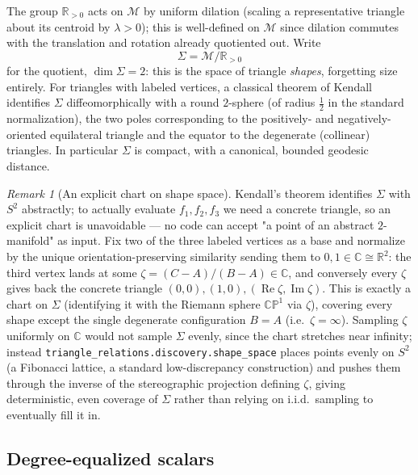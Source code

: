 \documentclass[11pt,reqno]{amsart}
\numberwithin{equation}{section}
\theoremstyle{definition}
\theoremstyle{remark}
\newtheorem{remark}[theorem]{Remark}
\newcommand{\M}{\mathcal{M}}
\begin{document}
The group $\mathbb R_{>0}$ acts on $\M$ by uniform dilation (scaling a
representative triangle about its centroid by $\lambda>0$); this is
well-defined on $\M$ since dilation commutes with the translation and
rotation already quotiented out. Write
\begin{equation}
  \Sigma=\M/\mathbb R_{>0}
\end{equation}
for the quotient, $\dim\Sigma=2$: this is the space of triangle
\emph{shapes}, forgetting size entirely. For triangles with labeled
vertices, a classical theorem of Kendall~\cite{kendall1984} identifies
$\Sigma$ diffeomorphically with a round $2$-sphere (of radius $\tfrac12$ in
the standard normalization), the two poles corresponding to the
positively- and negatively-oriented equilateral triangle and the equator to
the degenerate (collinear) triangles. In particular $\Sigma$ is compact,
with a canonical, bounded geodesic distance.

\begin{remark}[An explicit chart on shape space]\label{rem:chart}
Kendall's theorem identifies $\Sigma$ with $S^2$ abstractly; to actually
evaluate $f_1,f_2,f_3$ we need a concrete triangle, so an explicit chart is
unavoidable --- no code can accept "a point of an abstract $2$-manifold" as
input. Fix two of the three labeled vertices as a base and normalize by the
unique orientation-preserving similarity sending them to $0,1\in\mathbb
C\cong\mathbb R^2$: the third vertex lands at some
$\zeta=(C-A)/(B-A)\in\mathbb C$, and conversely every $\zeta$ gives back the
concrete triangle $(0,0),(1,0),(\operatorname{Re}\zeta,\operatorname{Im}\zeta)$.
This is exactly a chart on $\Sigma$ (identifying it with the Riemann sphere
$\mathbb{CP}^1$ via $\zeta$), covering every shape except the single
degenerate configuration $B=A$ (i.e.\ $\zeta=\infty$). Sampling $\zeta$
uniformly on $\mathbb C$ would not sample $\Sigma$ evenly, since the chart
stretches near infinity; instead
\texttt{triangle\_relations.discovery.shape\_space} places points evenly on
$S^2$ (a Fibonacci lattice, a standard low-discrepancy construction) and
pushes them through the inverse of the stereographic projection defining
$\zeta$, giving deterministic, even coverage of $\Sigma$ rather than relying
on i.i.d.\ sampling to eventually fill it in.
\end{remark}

\subsection{Degree-equalized scalars}
\end{document}
